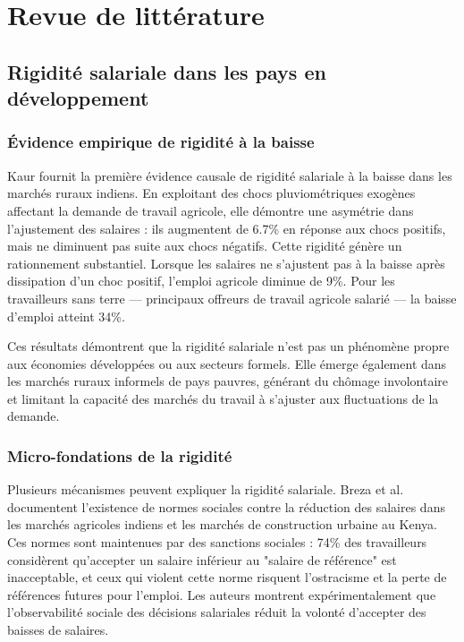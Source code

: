 \documentclass[12pt,a4paper]{article}
\begin{document}
\section{Revue de littérature}

\subsection{Rigidité salariale dans les pays en développement}

\subsubsection{Évidence empirique de rigidité à la baisse}

Kaur \citeyearpar{kaur2019} fournit la première évidence causale de rigidité salariale à la baisse dans les marchés ruraux indiens. En exploitant des chocs pluviométriques exogènes affectant la demande de travail agricole, elle démontre une asymétrie dans l'ajustement des salaires : ils augmentent de 6.7\% en réponse aux chocs positifs, mais ne diminuent pas suite aux chocs négatifs. Cette rigidité génère un rationnement substantiel. Lorsque les salaires ne s'ajustent pas à la baisse après dissipation d'un choc positif, l'emploi agricole diminue de 9\%. Pour les travailleurs sans terre — principaux offreurs de travail agricole salarié — la baisse d'emploi atteint 34\%.

Ces résultats démontrent que la rigidité salariale n'est pas un phénomène propre aux économies développées ou aux secteurs formels. Elle émerge également dans les marchés ruraux informels de pays pauvres, générant du chômage involontaire et limitant la capacité des marchés du travail à s'ajuster aux fluctuations de la demande.

\subsubsection{Micro-fondations de la rigidité}

Plusieurs mécanismes peuvent expliquer la rigidité salariale. Breza et al. \citeyearpar{breza2022} documentent l'existence de normes sociales contre la réduction des salaires dans les marchés agricoles indiens et les marchés de construction urbaine au Kenya. Ces normes sont maintenues par des sanctions sociales : 74\% des travailleurs considèrent qu'accepter un salaire inférieur au "salaire de référence" est inacceptable, et ceux qui violent cette norme risquent l'ostracisme et la perte de références futures pour l'emploi. Les auteurs montrent expérimentalement que l'observabilité sociale des décisions salariales réduit la volonté d'accepter des baisses de salaires.
\end{document}
